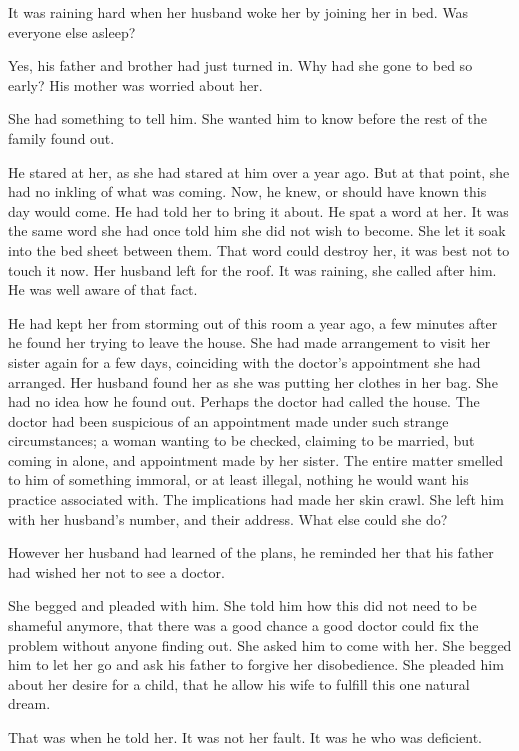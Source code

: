 \documentclass{article}
\begin{document}
It was raining hard when her husband woke her by joining her in bed. Was everyone else asleep? 

Yes, his father and brother had just turned in. Why had she gone to bed so early? His mother was worried about her.

She had something to tell him. She wanted him to know before the rest of the family found out.

He stared at her, as she had stared at him over a year ago. But at that point, she had no inkling of what was coming. Now, he knew, or should have known this day would come. He had told her to bring it about. He spat a word at her. It was the same word she had once told him she did not wish to become. She let it soak into the bed sheet between them. That word could destroy her, it was best not to touch it now. Her husband left for the roof. It was raining, she called after him. He was well aware of that fact. 

He had kept her from storming out of this room a year ago, a few minutes after he found her trying to leave the house. She had made arrangement to visit her sister again for a few days, coinciding with the doctor's appointment she had arranged. Her husband found her as she was putting her clothes in her bag. She had no idea how he found out. Perhaps the doctor had called the house. The doctor had been suspicious of an appointment made under such strange circumstances; a woman wanting to be checked, claiming to be married, but coming in alone, and appointment made by her sister. The entire matter smelled to him of something immoral, or at least illegal, nothing he would want his practice associated with. The implications had made her skin crawl. She left him with her husband's number, and their address. What else could she do?

However her husband had learned of the plans, he reminded her that his father had wished her not to see a doctor. 

She begged and pleaded with him. She told him how this did not need to be shameful anymore, that there was a good chance a good doctor could fix the problem without anyone finding out. She asked him to come with her. She begged him to let her go and ask his father to forgive her disobedience. She pleaded him about her desire for a child, that he allow his wife to fulfill this one natural dream. 

That was when he told her. It was not her fault. It was he who was deficient. 
\end{document}
